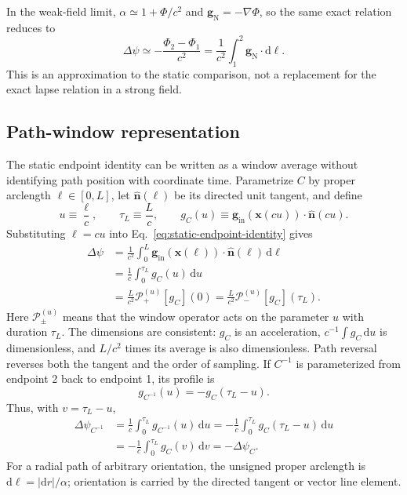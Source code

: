 \documentclass[12pt]{article}
\begin{document}
In the weak-field limit, $\alpha\simeq1+\Phi/c^2$ and $\mathbf{g}_{\mathrm{N}}=-\nabla\Phi$, so the same exact relation reduces to
\begin{equation}
  \Delta\psi\simeq-\frac{\Phi_2-\Phi_1}{c^2}
  =\frac{1}{c^2}\int_1^2\mathbf{g}_{\mathrm{N}}
    \cdot\mathrm{d}\boldsymbol{\ell}.
  \label{eq:weak-field-clock-comparison}
\end{equation}
This is an approximation to the static comparison, not a replacement for the exact lapse relation in a strong field.

\subsection{Path-window representation}

The static endpoint identity can be written as a window average without identifying path position with coordinate time. Parametrize $C$ by proper arclength $\ell\in[0,L]$, let $\hat{\mathbf n}(\ell)$ be its directed unit tangent, and define
\begin{equation}
  u\equiv\frac{\ell}{c},
  \qquad
  \tau_L\equiv\frac{L}{c},
  \qquad
  g_C(u)\equiv\mathbf{g}_{\mathrm{in}}\!\left(\mathbf{x}(cu)\right)
    \cdot\hat{\mathbf n}(cu).
  \label{eq:path-field-profile}
\end{equation}
Substituting $\ell=cu$ into Eq.~\eqref{eq:static-endpoint-identity} gives
\begin{align}
  \Delta\psi
  &=\frac{1}{c^2}\int_0^L
      \mathbf{g}_{\mathrm{in}}\!\left(\mathbf{x}(\ell)\right)
      \cdot\hat{\mathbf n}(\ell)\,\mathrm{d}\ell \\
  &=\frac{1}{c}\int_0^{\tau_L}g_C(u)\,\mathrm{d}u \\
  &=\frac{L}{c^2}\mathcal{P}_{+}^{(u)}[g_C](0)
   =\frac{L}{c^2}\mathcal{P}_{-}^{(u)}[g_C](\tau_L).
  \label{eq:path-window-map}
\end{align}
Here $\mathcal{P}_{\pm}^{(u)}$ means that the window operator acts on the parameter $u$ with duration $\tau_L$. The dimensions are consistent: $g_C$ is an acceleration, $c^{-1}\int g_C\,\mathrm{d}u$ is dimensionless, and $L/c^2$ times its average is also dimensionless. Path reversal reverses both the tangent and the order of sampling. If $C^{-1}$ is parameterized from endpoint 2 back to endpoint 1, its profile is
\begin{equation}
  g_{C^{-1}}(u)=-g_C(\tau_L-u).
\end{equation}
Thus, with $v=\tau_L-u$,
\begin{align*}
  \Delta\psi_{C^{-1}}
  &=\frac{1}{c}\int_0^{\tau_L}g_{C^{-1}}(u)\,\mathrm{d}u
   =-\frac{1}{c}\int_0^{\tau_L}g_C(\tau_L-u)\,\mathrm{d}u \\
  &=-\frac{1}{c}\int_0^{\tau_L}g_C(v)\,\mathrm{d}v
   =-\Delta\psi_C.
\end{align*}
For a radial path of arbitrary orientation, the unsigned proper arclength is $\mathrm{d}\ell=|\mathrm{d}r|/\alpha$; orientation is carried by the directed tangent or vector line element.
\end{document}
